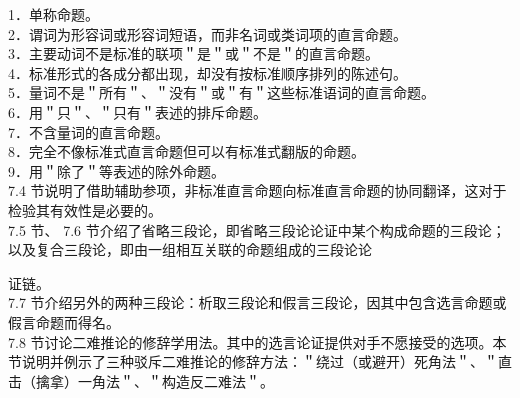 1．单称命题。\\
2．谓词为形容词或形容词短语，而非名词或类词项的直言命题。\\
3．主要动词不是标准的联项＂是＂或＂不是＂的直言命题。\\
4．标准形式的各成分都出现，却没有按标准顺序排列的陈述句。\\
5．量词不是＂所有＂、＂没有＂或＂有＂这些标准语词的直言命题。\\
6．用＂只＂、＂只有＂表述的排斥命题。\\
7．不含量词的直言命题。\\
8．完全不像标准式直言命题但可以有标准式翻版的命题。\\
9．用＂除了＂等表述的除外命题。\\
7.4 节说明了借助辅助参项，非标准直言命题向标准直言命题的协同翻译，这对于检验其有效性是必要的。\\
7.5 节、 7.6 节介绍了省略三段论，即省略三段论论证中某个构成命题的三段论；以及复合三段论，即由一组相互关联的命题组成的三段论论

证链。\\
7.7 节介绍另外的两种三段论：析取三段论和假言三段论，因其中包含选言命题或假言命题而得名。\\
7.8 节讨论二难推论的修辞学用法。其中的选言论证提供对手不愿接受的选项。本节说明并例示了三种驳斥二难推论的修辞方法：＂绕过（或避开）死角法＂、＂直击（擒拿）一角法＂、＂构造反二难法＂。

